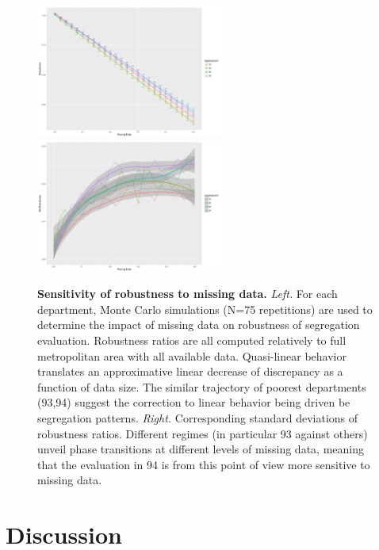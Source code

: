 \documentclass[runningheads,a4paper]{llncs2e/llncs}
\begin{document}
\begin{figure}
\centering
\hspace{-2cm}\includegraphics[width=0.55\textwidth]{figures/alldeps_rob_renormindics}
\includegraphics[width=0.55\textwidth]{figures/alldeps_robsd_renormindics}\hspace{-2cm}
\caption{\textbf{Sensitivity of robustness to missing data.} \textit{Left.} For each department, Monte Carlo simulations (N=75 repetitions) are used to determine the impact of missing data on robustness of segregation evaluation. Robustness ratios are all computed relatively to full metropolitan area with all available data. Quasi-linear behavior translates an approximative linear decrease of discrepancy as a function of data size. The similar trajectory of poorest departments (93,94) suggest the correction to linear behavior being driven be segregation patterns. \textit{Right.} Corresponding standard deviations of robustness ratios. Different regimes (in particular 93 against others) unveil phase transitions at different levels of missing data, meaning that the evaluation in 94 is from this point of view more sensitive to missing data.}
\end{figure}





\section{Discussion}
\end{document}
